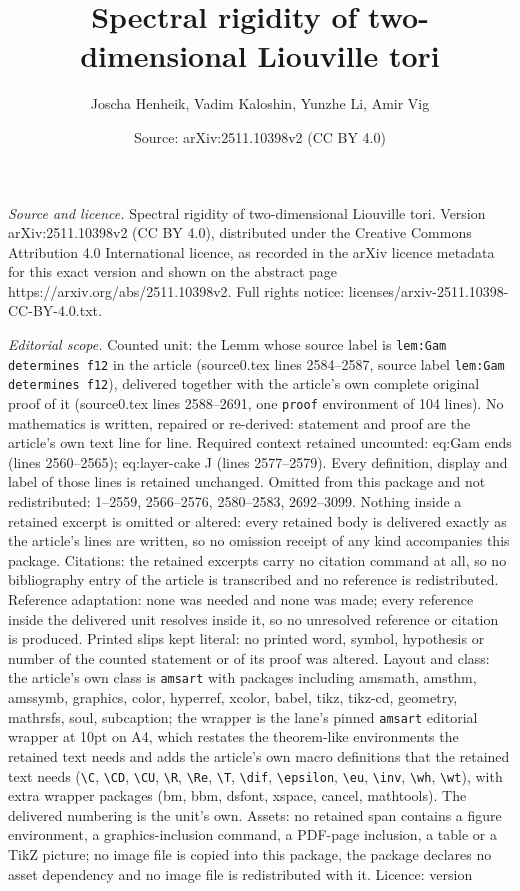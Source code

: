 \documentclass[10pt,a4paper]{amsart}
\title[Spectral rigidity of two-dimensional Liouville tori]{Spectral rigidity of two-dimensional Liouville tori}
\author{Joscha Henheik, Vadim Kaloshin, Yunzhe Li, Amir Vig}
\date{Source: arXiv:2511.10398v2 (CC BY 4.0)}
\begin{document}
\maketitle

\noindent\emph{Source and licence.} Spectral rigidity of two-dimensional Liouville tori. Version arXiv:2511.10398v2 (CC BY 4.0), distributed under the Creative Commons Attribution 4.0 International licence, as recorded in the arXiv licence metadata for this exact version and shown on the abstract page https://arxiv.org/abs/2511.10398v2. Full rights notice: licenses/arxiv-2511.10398-CC-BY-4.0.txt.\par\smallskip

\noindent\textit{Editorial scope.} Counted unit: the Lemm whose source label is \texttt{lem:Gam determines f12} in the article (source0.tex lines 2584--2587, source label \texttt{lem:Gam determines f12}), delivered together with the article's own complete original proof of it (source0.tex lines 2588--2691, one \texttt{proof} environment of 104 lines). No mathematics is written, repaired or re-derived: statement and proof are the article's own text line for line. Required context retained uncounted: eq:Gam ends (lines 2560--2565); eq:layer-cake J (lines 2577--2579). Every definition, display and label of those lines is retained unchanged. Omitted from this package and not redistributed: 1--2559, 2566--2576, 2580--2583, 2692--3099. Nothing inside a retained excerpt is omitted or altered: every retained body is delivered exactly as the article's lines are written, so no omission receipt of any kind accompanies this package. Citations: the retained excerpts carry no citation command at all, so no bibliography entry of the article is transcribed and no reference is redistributed. Reference adaptation: none was needed and none was made; every reference inside the delivered unit resolves inside it, so no unresolved reference or citation is produced. Printed slips kept literal: no printed word, symbol, hypothesis or number of the counted statement or of its proof was altered. Layout and class: the article's own class is \texttt{amsart} with packages including amsmath, amsthm, amssymb, graphics, color, hyperref, xcolor, babel, tikz, tikz-cd, geometry, mathrsfs, soul, subcaption; the wrapper is the lane's pinned \texttt{amsart} editorial wrapper at 10pt on A4, which restates the theorem-like environments the retained text needs and adds the article's own macro definitions that the retained text needs (\texttt{\textbackslash C}, \texttt{\textbackslash CD}, \texttt{\textbackslash CU}, \texttt{\textbackslash R}, \texttt{\textbackslash Re}, \texttt{\textbackslash T}, \texttt{\textbackslash dif}, \texttt{\textbackslash epsilon}, \texttt{\textbackslash eu}, \texttt{\textbackslash inv}, \texttt{\textbackslash wh}, \texttt{\textbackslash wt}), with extra wrapper packages (bm, bbm, dsfont, xspace, cancel, mathtools). The delivered numbering is the unit's own. Assets: no retained span contains a figure environment, a graphics-inclusion command, a PDF-page inclusion, a table or a TikZ picture; no image file is copied into this package, the package declares no asset dependency and no image file is redistributed with it. Licence: version 
\end{document}
